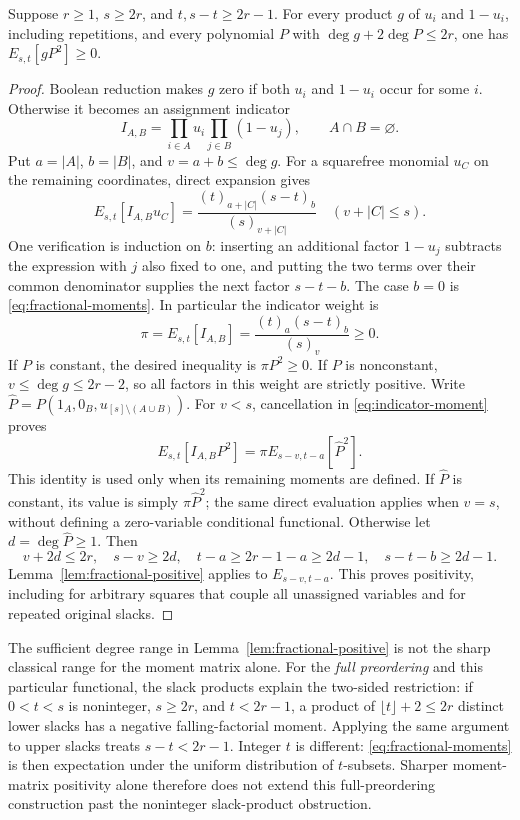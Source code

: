 \begin{lemma}
\label{lem:assignment-localizer}
Suppose $r\ge1$, $s\ge2r$, and $t,s-t\ge2r-1$.
For every product $g$ of $u_i$ and $1-u_i$, including repetitions, and
every polynomial $P$ with
$\deg g+2\deg P\le2r$, one has $E_{s,t}[gP^2]\ge0$.
\end{lemma}
\begin{proof}
Boolean reduction makes $g$ zero if both $u_i$ and $1-u_i$ occur for
some $i$. Otherwise it becomes an assignment indicator
\[
 I_{A,B}=\prod_{i\in A}u_i\prod_{j\in B}(1-u_j),\qquad A\cap B=\varnothing.
\]
Put $a=|A|$, $b=|B|$, and $v=a+b\le\deg g$. For a squarefree monomial
$u_C$ on the remaining coordinates, direct expansion gives
\begin{equation}\label{eq:indicator-moment}
 E_{s,t}[I_{A,B}u_C]
 =\frac{(t)_{a+|C|}(s-t)_b}{(s)_{v+|C|}}
 \quad(v+|C|\le s).
\end{equation}
One verification is induction on $b$: inserting an additional factor
$1-u_j$ subtracts the expression with $j$ also fixed to one, and putting
the two terms over their common denominator supplies the next factor
$s-t-b$. The case $b=0$ is \eqref{eq:fractional-moments}.
In particular the indicator weight is
\[
 \pi=E_{s,t}[I_{A,B}]=\frac{(t)_a(s-t)_b}{(s)_v}\ge0.
\]
If $P$ is constant, the desired inequality is $\pi P^2\ge0$.
If $P$ is nonconstant, $v\le\deg g\le2r-2$, so all factors in this
weight are strictly positive. Write
$\widehat P=P(1_A,0_B,u_{[s]\setminus(A\cup B)})$.
For $v<s$, cancellation in \eqref{eq:indicator-moment} proves
\begin{equation}\label{eq:conditional-moments}
 E_{s,t}[I_{A,B}P^2]=\pi E_{s-v,t-a}[\widehat P^2].
\end{equation}
This identity is used only when its remaining moments are defined.
If $\widehat P$ is constant, its value is simply $\pi\widehat P^2$;
the same direct evaluation applies when $v=s$, without defining a
zero-variable conditional functional.
Otherwise let $d=\deg\widehat P\ge1$. Then
\[
 v+2d\le2r,\quad s-v\ge2d,\quad
 t-a\ge2r-1-a\ge2d-1,\quad s-t-b\ge2d-1.
\]
Lemma~\ref{lem:fractional-positive} applies to
$E_{s-v,t-a}$. This proves positivity, including for arbitrary squares
that couple all unassigned variables and for repeated original slacks.
\end{proof}

The sufficient degree range in Lemma~\ref{lem:fractional-positive} is
not the sharp classical range for the moment matrix alone. For the
\emph{full preordering} and this particular functional, the slack
products explain the two-sided restriction: if $0<t<s$ is noninteger,
$s\ge2r$, and $t<2r-1$, a product of $\lfloor t\rfloor+2\le2r$
distinct lower slacks has a negative falling-factorial moment. Applying
the same argument to upper slacks treats $s-t<2r-1$. Integer $t$ is
different: \eqref{eq:fractional-moments} is then expectation under the
uniform distribution of $t$-subsets. Sharper moment-matrix positivity
alone therefore does not extend this full-preordering construction past
the noninteger slack-product obstruction.

